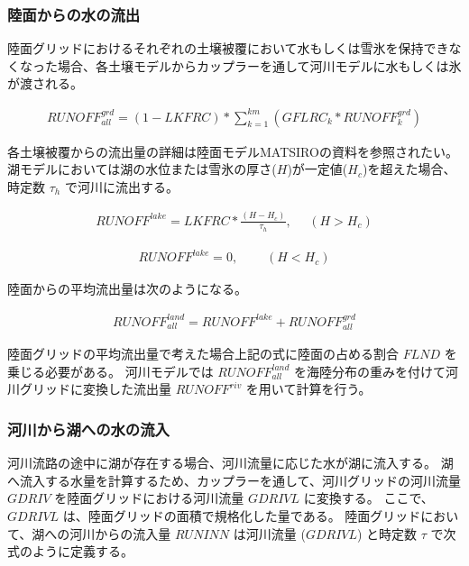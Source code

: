 \hypertarget{ux9678ux9762ux304bux3089ux306eux6c34ux306eux6d41ux51fa}{%
\subsubsection{陸面からの水の流出}\label{ux9678ux9762ux304bux3089ux306eux6c34ux306eux6d41ux51fa}}

陸面グリッドにおけるそれぞれの土壌被覆において水もしくは雪氷を保持できなくなった場合、各土壌モデルからカップラーを通して河川モデルに水もしくは氷が渡される。

\begin{eqnarray} RUNOFF^{grd}_{all} = 
    (1-LKFRC) * \sum_{k=1}^{km}(GFLRC_{k} * RUNOFF^{grd}_{k}) \end{eqnarray}

各土壌被覆からの流出量の詳細は陸面モデルMATSIROの資料を参照されたい。
湖モデルにおいては湖の水位または雪氷の厚さ(\(H\))が一定値(\(H_c\))を超えた場合、時定数
\(\tau_h\) で河川に流出する。

\begin{eqnarray} RUNOFF^{lake} = LKFRC * \frac{(H-H_c)}{\tau_h},~~~~~~ (H>H_c) \end{eqnarray}

\begin{eqnarray} RUNOFF^{lake} = 0,~~~~~~~~~~ (H<H_c) \end{eqnarray}

陸面からの平均流出量は次のようになる。

\begin{eqnarray} RUNOFF^{land}_{all} = RUNOFF^{lake} + RUNOFF^{grd}_{all} \end{eqnarray}

陸面グリッドの平均流出量で考えた場合上記の式に陸面の占める割合 \(FLND\)
を乗じる必要がある。 河川モデルでは \(RUNOFF^{land}_{all}\)
を海陸分布の重みを付けて河川グリッドに変換した流出量 \(RUNOFF^{riv}\)
を用いて計算を行う。

\hypertarget{ux6cb3ux5dddux304bux3089ux6e56ux3078ux306eux6c34ux306eux6d41ux5165}{%
\subsubsection{河川から湖への水の流入}\label{ux6cb3ux5dddux304bux3089ux6e56ux3078ux306eux6c34ux306eux6d41ux5165}}

河川流路の途中に湖が存在する場合、河川流量に応じた水が湖に流入する。
湖へ流入する水量を計算するため、カップラーを通して、河川グリッドの河川流量
\(GDRIV\) を陸面グリッドにおける河川流量 \(GDRIVL\) に変換する。
ここで、 \(GDRIVL\) は、陸面グリッドの面積で規格化した量である。
陸面グリッドにおいて、湖への河川からの流入量 \(RUNINN\) は河川流量
(\(GDRIVL\)) と時定数 \(\tau\) で次式のように定義する。

